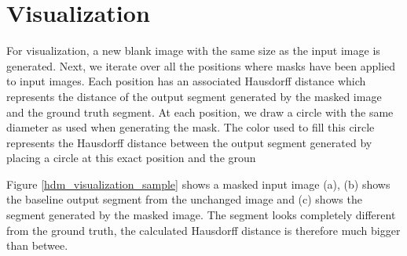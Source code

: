 \section{Visualization}




For visualization, a new blank image with the same size as the input image is generated. Next, we iterate over all the positions where masks have been
applied to input images. Each position has an associated Hausdorff distance which represents the distance of the output segment generated by the masked image and the ground truth segment.
At each position, we draw a circle with the same diameter as used when generating the mask. The color used to fill this circle represents the Hausdorff distance between the output segment generated by placing a circle at this exact position and the groun







Figure \ref{hdm_visualization_sample} shows a masked input image (a), (b) shows the baseline output segment from the unchanged image and (c) shows the segment generated by the masked image.
The segment looks completely different from the ground truth, the calculated Hausdorff distance is therefore much bigger than betwee.


